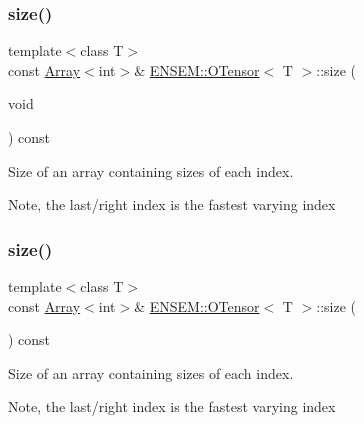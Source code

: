 \subsubsection{\texorpdfstring{size()}{size()}\hspace{0.1cm}{\footnotesize\ttfamily [4/6]}}
{\footnotesize\ttfamily template$<$class T$>$ \\
const \mbox{\hyperlink{classXMLArray_1_1Array}{Array}}$<$int$>$\& \mbox{\hyperlink{classENSEM_1_1OTensor}{E\+N\+S\+E\+M\+::\+O\+Tensor}}$<$ T $>$\+::size (\begin{DoxyParamCaption}\item[{void}]{ }\end{DoxyParamCaption}) const\hspace{0.3cm}{\ttfamily [inline]}}



Size of an array containing sizes of each index. 

Note, the last/right index is the fastest varying index \mbox{\label{classENSEM_1_1OTensor_aa34f5311f161a9b4aef0b08af6fb8d34}} 
\subsubsection{\texorpdfstring{size()}{size()}\hspace{0.1cm}{\footnotesize\ttfamily [5/6]}}
{\footnotesize\ttfamily template$<$class T$>$ \\
const \mbox{\hyperlink{classXMLArray_1_1Array}{Array}}$<$int$>$\& \mbox{\hyperlink{classENSEM_1_1OTensor}{E\+N\+S\+E\+M\+::\+O\+Tensor}}$<$ T $>$\+::size (\begin{DoxyParamCaption}{ }\end{DoxyParamCaption}) const\hspace{0.3cm}{\ttfamily [inline]}}



Size of an array containing sizes of each index. 

Note, the last/right index is the fastest varying index \mbox{\label{classENSEM_1_1OTensor_aa34f5311f161a9b4aef0b08af6fb8d34}} 
